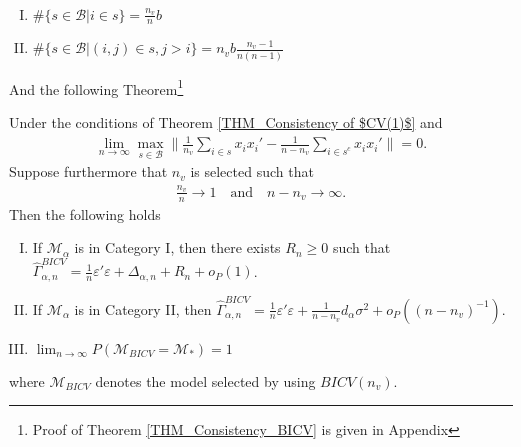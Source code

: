 \documentclass[Research_Module_ES.tex]{subfiles}
\begin{document}
\begin{claim}~
	\label{Claim_BICV}
	\begin{enumerate}[(I)]
	\item $\#\{s\in \mathcal{B}| i\in s\} = \frac{n_v}{n} b$ 
	\item $\#\{s\in\mathcal{B}|(i,j)\in s, j>i\}=n_vb\frac{n_v-1}{n(n-1)}$
	\end{enumerate}
\end{claim}
And the following Theorem\footnote{Proof of Theorem \ref{THM_Consistency_BICV} is given in Appendix }
\begin{thm}
	\label{THM_Consistency_BICV}
Under the conditions of Theorem \ref{THM_Consistency of $CV(1)$} and
\begin{align*}
\lim_{n\to\infty} \max_{s\in \mathcal{B}}\biggl\lVert \frac{1}{n_v}\sum_{i\in s}x_ix_i' - \frac{1}{n-n_v}\sum_{i\in s^c}x_ix_i'\biggr\rVert =0.
\end{align*}
Suppose furthermore that $n_v$ is selected such that
\begin{align*}
\frac{n_v}{n}\to 1 \quad \textrm{and} \quad n-n_v \to \infty.
\end{align*}
Then the following holds
\begin{enumerate}[(I)]
\item If $\mathcal{M}_\alpha$ is in Category I, then there exists $R_n \ge 0$ such that $\hat{\Gamma}_{\alpha,n}^{BICV} = \frac{1}{n}\varepsilon'\varepsilon + \Delta_{\alpha,n} + R_n + o_P(1)$.
\item If $\mathcal{M}_\alpha$ is in Category II, then $\hat{\Gamma}_{\alpha,n}^{BICV} = \frac{1}{n}\varepsilon'\varepsilon + \frac{1}{n-n_v}d_\alpha\sigma^2  + o_P((n-n_v)^{-1})$.
\item $\lim_{n\to\infty}P(\mathcal{M}_{BICV}=\mathcal{M}_\ast) = 1$
\end{enumerate}
where $\mathcal{M}_{BICV}$ denotes the model selected by using $BICV(n_v)$.
\end{thm}
\end{document}
